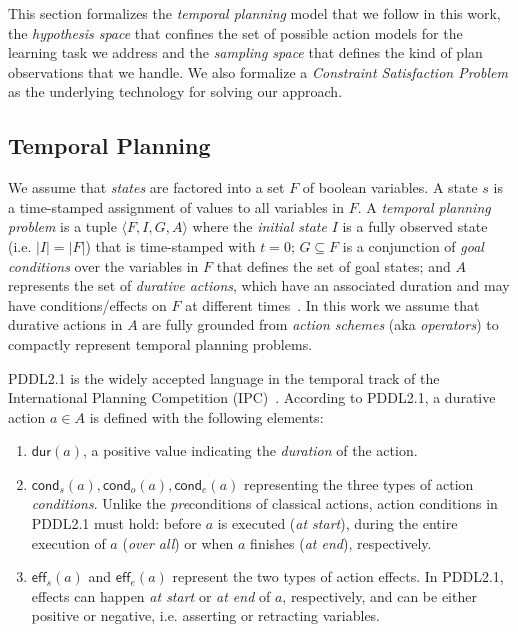 \documentclass{ecai}
\newcommand{\tup}[1]{{\langle #1 \rangle}}
\newcommand{\eff}{\mathsf{eff}}    %
\newcommand{\cond}{\mathsf{cond}}  %
\newcommand{\dur}{\mathsf{dur}}    %
\begin{document}
This section formalizes the {\em temporal planning} model that we follow in this work, the {\em hypothesis space} that confines the set of possible action models for the learning task we address and the {\em sampling space} that defines the kind of plan observations that we handle. We also formalize a {\em Constraint Satisfaction Problem} as the underlying technology for solving our approach.

\subsection{Temporal Planning}
\label{sec:temporalplanning}

We assume that {\em states} are factored into a set $F$ of boolean variables. A state $s$ is a time-stamped assignment of values to all variables in $F$. 
A {\em temporal planning problem} is a tuple $\tup{F,I,G,A}$ where the {\em initial state} $I$ is a fully observed state (i.e. $|I|=|F|$) that is time-stamped with $t=0$; $G \subseteq F$ is a conjunction of {\em goal conditions} over the variables in $F$ that defines the set of goal states; and $A$ represents the set of {\em durative actions}, which have an associated duration and may have conditions/effects on $F$ at different times~\cite{garrido2009constraint,vidal2006branching}.
In this work we assume that durative actions in $A$ are fully grounded from {\em action schemes} (aka {\em operators}) to compactly represent temporal planning problems. 

PDDL2.1 is the widely accepted language in the
temporal track of the International Planning Competition (IPC)~\cite{fox2003pddl2,ghallab2004automated}. According to PDDL2.1, a durative action $a\in A$ is defined with the following elements:

\begin{enumerate}
\item $\dur(a)$, a positive value indicating the {\em duration} of the action.

\item $\cond_s(a), \cond_o(a), \cond_e(a)$ representing the three types of action {\em conditions}. Unlike the \emph{pre}conditions of classical actions, action conditions in PDDL2.1 must hold: before $a$ is executed ({\em at start}), during the entire execution of $a$ ({\em over all}) or when $a$ finishes ({\em at end}), respectively. 

\item $\eff_s(a)$ and $\eff_e(a)$ represent the two types of action effects. In PDDL2.1, effects can happen {\em at start} or {\em at end} of $a$, respectively, and can be either positive or negative, i.e. asserting or retracting variables. 

\end{enumerate}
\end{document}

